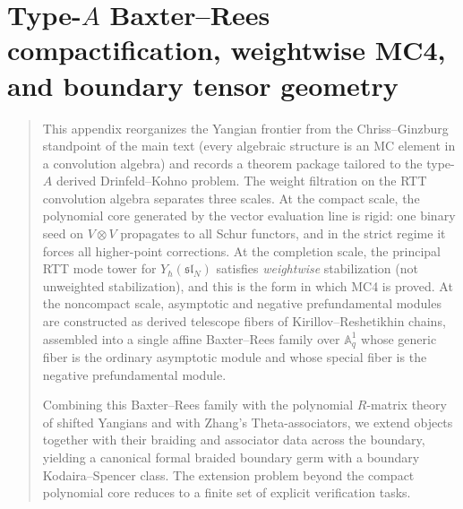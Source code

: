 
\chapter{Type-$A$ Baxter--Rees compactification, weightwise MC4, and boundary tensor geometry}
\label{app:typeA-baxter-rees-theta}

\begin{quote}
This appendix reorganizes the Yangian frontier from the Chriss--Ginzburg
standpoint of the main text (every algebraic structure is an MC element
in a convolution algebra) and records a theorem package tailored to the
type-$A$ derived Drinfeld--Kohno problem.  The weight filtration on the
RTT convolution algebra separates three scales.  At the compact scale, the
polynomial core generated by the vector evaluation line is rigid: one
binary seed on $V\otimes V$ propagates to all Schur functors, and in the
strict regime it forces all higher-point corrections.  At the completion
scale, the principal RTT mode tower for $Y_\hbar(\mathfrak{sl}_N)$
satisfies \emph{weightwise} stabilization (not unweighted stabilization),
and this is the form in which MC4 is proved.  At the noncompact scale,
asymptotic and negative prefundamental modules are constructed as derived
telescope fibers of Kirillov--Reshetikhin chains, assembled into a single
affine Baxter--Rees family over $\mathbb A^1_q$ whose generic fiber is the
ordinary asymptotic module and whose special fiber is the negative
prefundamental module.

Combining this Baxter--Rees family with the polynomial $R$-matrix theory
of shifted Yangians and with Zhang's Theta-associators, we extend objects
together with their braiding and associator data across the boundary,
yielding a canonical formal braided boundary germ with a boundary
Kodaira--Spencer class.  The extension problem beyond the compact
polynomial core reduces to a finite set of explicit verification tasks.
\end{quote}

